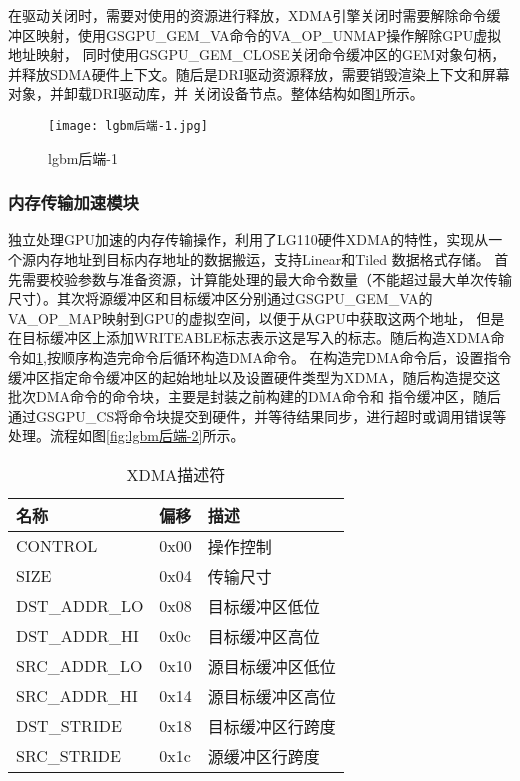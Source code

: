 在驱动关闭时，需要对使用的资源进行释放，XDMA引擎关闭时需要解除命令缓冲区映射，使用GSGPU\_GEM\_VA命令的VA\_OP\_UNMAP操作解除GPU虚拟地址映射​，
同时使用GSGPU\_GEM\_CLOSE关闭命令缓冲区的GEM对象句柄，并释放SDMA硬件上下文​。随后是DRI驱动资源释放，需要销毁渲染上下文和屏幕对象，并卸载DRI驱动库，并
关闭设备节点。整体结构如图\ref{fig:lgbm后端-1}所示。

\begin{figure}[h]
  \centering
  \texttt{[image: lgbm后端-1.jpg]}
  \caption{lgbm后端-1}
  \label{fig:lgbm后端-1}
\end{figure}  

\subsubsection{内存传输加速模块}

独立处理GPU加速的内存传输操作，利用了LG110硬件XDMA的特性，实现从一个源内存地址到目标内存地址的数据搬运，支持Linear和Tiled 数据格式存储。
首先需要校验参数与准备资源，计算能处理的最大命令数量（不能超过最大单次传输尺寸）。其次将源缓冲区和目标缓冲区分别通过GSGPU\_GEM\_VA的VA\_OP\_MAP映射到GPU的虚拟空间，以便于从GPU中获取这两个地址，
但是在目标缓冲区上添加WRITEABLE标志表示这是写入的标志。随后构造XDMA命令如\ref{tab:XDMA描述符},按顺序构造完命令后循环构造DMA命令。
在构造完DMA命令后，设置指令缓冲区指定命令缓冲区的起始地址以及设置硬件类型为XDMA，随后构造提交这批次DMA命令的命令块，主要是封装之前构建的DMA命令和
指令缓冲区，随后通过GSGPU\_CS将命令块提交到硬件，并等待结果同步，进行超时或调用错误等处理。流程如图\ref{fig:lgbm后端-2}所示。

\begin{table}[h]  
  \centering
  \caption{XDMA描述符}
  \label{tab:XDMA描述符}
  \begin{tabular}{lll}
    \toprule
    名称  & 偏移 & 描述\\
    \midrule
    CONTROL & 0x00 & 操作控制\\
    SIZE & 0x04 & 传输尺寸\\
    DST\_ADDR\_LO & 0x08 & 目标缓冲区低位\\
    DST\_ADDR\_HI & 0x0c & 目标缓冲区高位\\
    SRC\_ADDR\_LO & 0x10 & 源目标缓冲区低位\\
    SRC\_ADDR\_HI & 0x14 & 源目标缓冲区高位\\
    DST\_STRIDE & 0x18 & 目标缓冲区行跨度\\
    SRC\_STRIDE & 0x1c & 源缓冲区行跨度\\
    \bottomrule
  \end{tabular}
  \note{}
\end{table}

